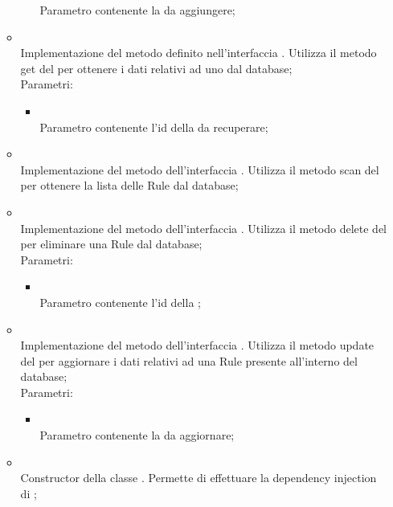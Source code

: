\begin{itemize}
\begin{itemize}
\begin{itemize}
			Parametro contenente la  da aggiungere;
		\end{itemize}
		\item[]  \\		Implementazione del metodo definito nell'interfaccia . Utilizza il metodo get del  per ottenere i dati relativi ad uno  dal database;\\
		Parametri:
		\begin{itemize}
			\item {} \\
			Parametro contenente l'id della  da recuperare;
		\end{itemize}
		\item[]  \\		Implementazione del metodo dell'interfaccia . Utilizza il metodo scan del \\  per ottenere la lista delle Rule dal database;\\
		\item[]  \\		Implementazione del metodo dell'interfaccia . Utilizza il metodo delete del  per eliminare una Rule dal database;\\
		Parametri:
		\begin{itemize}
			\item {} \\
			Parametro contenente l'id della ;
		\end{itemize}
		\item[]  \\		Implementazione del metodo dell'interfaccia . Utilizza il metodo update del  per aggiornare i dati relativi ad una Rule presente all'interno del database;\\
		Parametri:
		\begin{itemize}
			\item {} \\
			Parametro contenente la  da aggiornare;
		\end{itemize}
		\item[]  \\		Constructor della classe . Permette di effettuare la dependency injection di ;\\

\end{itemize}
\end{itemize}
